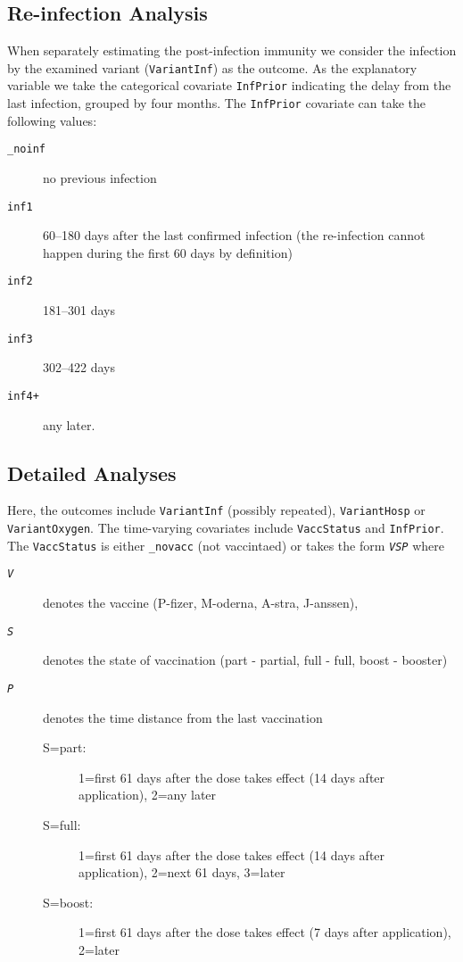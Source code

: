 \documentclass[9pt,onecolumn,twoside,lineno]{pnas-new}
\begin{document}
\subsection*{Re-infection Analysis}

When separately estimating the post-infection immunity we consider the infection by the examined variant ({\tt VariantInf}) as the outcome. As the explanatory variable we take the categorical covariate {\tt InfPrior} indicating the delay from the last infection, grouped by four months. The {\tt InfPrior} covariate can take the following values: 
\begin{description}
\item[{\tt \_noinf}] no previous infection
\item[{\tt inf1}] 60--180 days after the last confirmed infection (the re-infection cannot happen during the first 60 days by definition)
\item[{\tt inf2}] 181--301 days 
\item[{\tt inf3}] 302--422 days 
\item[{\tt inf4+}] any later.
\end{description}

\subsection*{Detailed Analyses}

Here, the outcomes include {\tt VariantInf} (possibly repeated),  {\tt VariantHosp} or {\tt VariantOxygen}. The time-varying covariates include  {\tt VaccStatus} and {\tt InfPrior}.
The {\tt VaccStatus} is either {\tt \_novacc} (not vaccintaed) or takes the form {\tt \em VSP} where
\begin{description}
\item[{\tt \em V}] denotes the vaccine (P-fizer, M-oderna, A-stra, J-anssen),
\item[{\tt \em S}] denotes the state of vaccination (part - partial, full - full, boost - booster)
\item[{\tt \em P}] denotes the time distance from the last vaccination
\begin{description}
\item[S=part:] 1=first 61 days after the dose takes effect (14 days after application), 2=any later
\item[S=full:] 1=first 61 days after the dose takes effect (14 days after application), 2=next 61 days, 3=later
\item[S=boost:] 1=first 61 days after the dose takes effect (7 days after application), 2=later 
\end{description}
\end{description}
\end{document}
